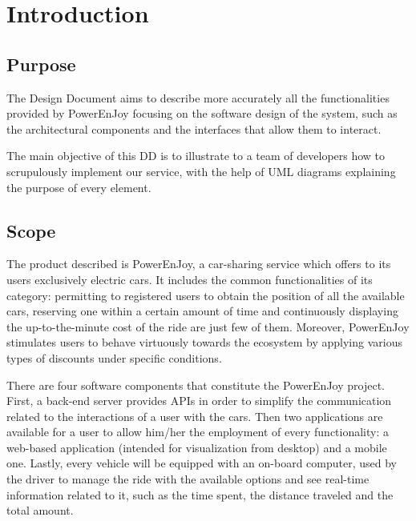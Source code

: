 \chapter{Introduction}

\section{Purpose}
The Design Document aims to describe more accurately all the functionalities provided by PowerEnJoy focusing on the software design of the system, such as the architectural components and the interfaces that allow them to interact.

The main objective of this DD is to illustrate to a team of developers how to scrupulously implement our service, with the help of UML diagrams explaining the purpose of every element.

\section{Scope}
The product described is PowerEnJoy, a car-sharing service which offers to its users exclusively electric cars. It includes the common functionalities of its category: permitting to registered users to obtain the position of all the available cars, reserving one within a certain amount of time and continuously displaying the up-to-the-minute cost of the ride are just few of them. Moreover, PowerEnJoy stimulates users to behave virtuously towards the ecosystem by applying various types of discounts under specific conditions.

There are four software components that constitute the PowerEnJoy project. First, a back-end server provides APIs in order to simplify the communication related to the interactions of a user with the cars. Then two applications are available for a user to allow him/her the employment of every functionality: a web-based application (intended for visualization from desktop) and a mobile one. Lastly, every vehicle will be equipped with an on-board computer, used by the driver to manage the ride with the available options and see real-time information related to it, such as the time spent, the distance traveled and the total amount.

